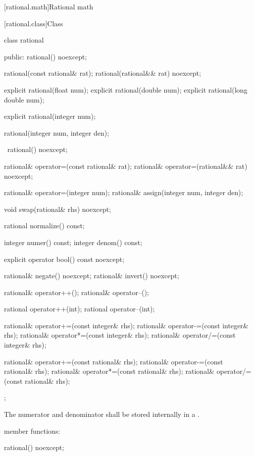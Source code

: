
[rational.math]{Rational math}

[rational.class]{Class }

\begin{codeblock}
class rational {
public:
    rational() noexcept;

    rational(const rational& rat);
    rational(rational&& rat) noexcept;

    explicit rational(float num);
    explicit rational(double num);
    explicit rational(long double num);

    explicit rational(integer num);

    rational(integer num, integer den);

    ~rational() noexcept;

    rational& operator=(const rational& rat);
    rational& operator=(rational&& rat) noexcept;

    rational& operator=(integer num);
    rational& assign(integer num, integer den);

    void swap(rational& rhs) noexcept;

    rational normalize() const;

    integer numer() const;
    integer denom() const;

    explicit operator bool() const noexcept;

    rational& negate() noexcept;
    rational& invert() noexcept;

    rational& operator++();
    rational& operator--();

    rational operator++(int);
    rational operator--(int);

    rational& operator+=(const integer& rhs);
    rational& operator-=(const integer& rhs);
    rational& operator*=(const integer& rhs);
    rational& operator/=(const integer& rhs);

    rational& operator+=(const rational& rhs);
    rational& operator-=(const rational& rhs);
    rational& operator*=(const rational& rhs);
    rational& operator/=(const rational& rhs);
};
\end{codeblock}

The numerator and denominator shall be stored internally in a .

 member functions:

\begin{itemdecl}
rational() noexcept;
\end{itemdecl}

